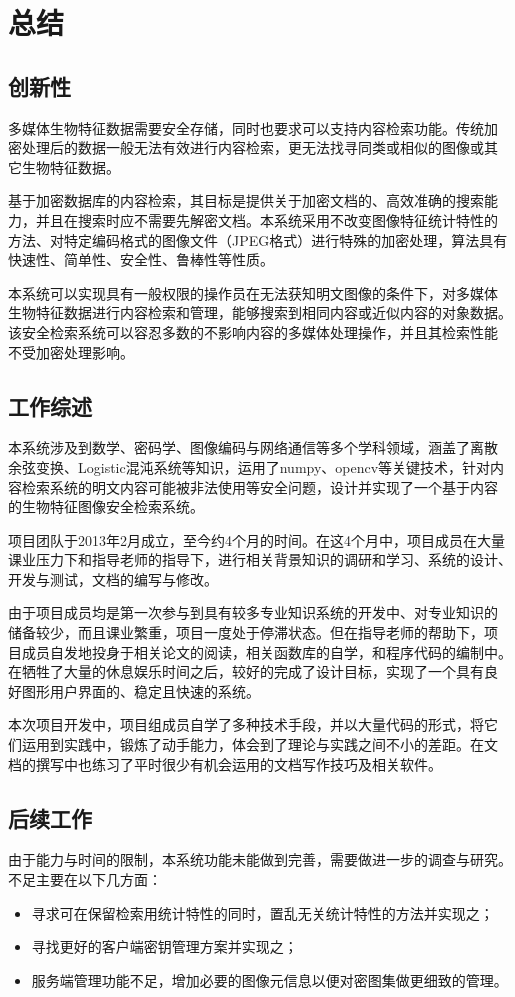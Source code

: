 
\chapter{总结}
\label{chap:summary}

\section{创新性}
\label{sec:creative-points}

多媒体生物特征数据需要安全存储，同时也要求可以支持内容检索功能。传统加
密处理后的数据一般无法有效进行内容检索，更无法找寻同类或相似的图像或其
它生物特征数据。

基于加密数据库的内容检索，其目标是提供关于加密文档的、高效准确的搜索能
力，并且在搜索时应不需要先解密文档。本系统采用不改变图像特征统计特性的
方法、对特定编码格式的图像文件（JPEG格式）进行特殊的加密处理，算法具有
快速性、简单性、安全性、鲁棒性等性质。

本系统可以实现具有一般权限的操作员在无法获知明文图像的条件下，对多媒体
生物特征数据进行内容检索和管理，能够搜索到相同内容或近似内容的对象数据。
该安全检索系统可以容忍多数的不影响内容的多媒体处理操作，并且其检索性能
不受加密处理影响。

\section{工作综述}
\label{sec:work-overview}

本系统涉及到数学、密码学、图像编码与网络通信等多个学科领域，涵盖了离散
余弦变换、Logistic混沌系统等知识，运用了numpy、opencv等关键技术，针对内
容检索系统的明文内容可能被非法使用等安全问题，设计并实现了一个基于内容
的生物特征图像安全检索系统。

项目团队于2013年2月成立，至今约4个月的时间。在这4个月中，项目成员在大量
课业压力下和指导老师的指导下，进行相关背景知识的调研和学习、系统的设计、
开发与测试，文档的编写与修改。

由于项目成员均是第一次参与到具有较多专业知识系统的开发中、对专业知识的
储备较少，而且课业繁重，项目一度处于停滞状态。但在指导老师的帮助下，项
目成员自发地投身于相关论文的阅读，相关函数库的自学，和程序代码的编制中。
在牺牲了大量的休息娱乐时间之后，较好的完成了设计目标，实现了一个具有良
好图形用户界面的、稳定且快速的系统。

本次项目开发中，项目组成员自学了多种技术手段，并以大量代码的形式，将它
们运用到实践中，锻炼了动手能力，体会到了理论与实践之间不小的差距。在文
档的撰写中也练习了平时很少有机会运用的文档写作技巧及相关软件。

\section{后续工作}
\label{sec:next-step}

由于能力与时间的限制，本系统功能未能做到完善，需要做进一步的调查与研究。
不足主要在以下几方面：
\begin{itemize}
\item 寻求可在保留检索用统计特性的同时，置乱无关统计特性的方法并实现之；
\item 寻找更好的客户端密钥管理方案并实现之；
\item 服务端管理功能不足，增加必要的图像元信息以便对密图集做更细致的管理。
\end{itemize}

